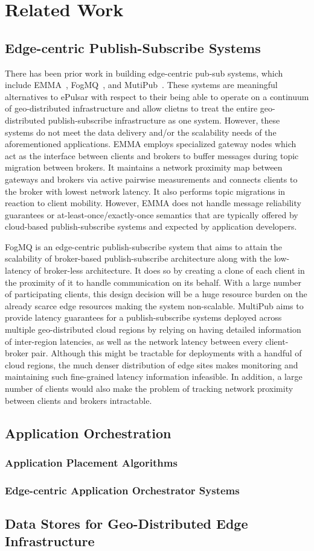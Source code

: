 \chapter{Related Work}

\section{Edge-centric Publish-Subscribe Systems}

There has been prior work in building edge-centric pub-sub systems, which include EMMA~\cite{emma}, FogMQ~\cite{DBLP:journals/corr/AbdelwahabH16a}, and MutiPub~\cite{multipub}. These systems are meaningful alternatives to ePulsar with respect to their being able to operate on a continuum of geo-distributed infrastructure and allow clietns to treat the entire geo-distributed publish-subscribe infrastructure as one system. However, these systems do not meet the data delivery and/or the scalability needs of the aforementioned applications. EMMA employs specialized gateway nodes which act as the interface between clients and brokers to buffer messages during topic migration between brokers. It maintains a network proximity map between gateways and brokers via active pairwise measurements and connects clients to the broker with lowest network latency. It also performs topic migrations in reaction to client mobility. However, EMMA does not handle message reliability guarantees or at-least-once/exactly-once semantics that are typically offered by cloud-based publish-subscribe systems and expected by application developers. 
\par FogMQ is an edge-centric publish-subscribe system that aims to attain the scalability of broker-based publish-subscribe architecture along with the low-latency of broker-less architecture. It does so by creating a clone of each client in the proximity of it to handle communication on its behalf. With a large number of participating clients, this design decision will be a huge resource burden on the already scarce edge resources making the system non-scalable. MultiPub aims to provide latency guarantees for a publish-subscribe systems deployed across multiple geo-distributed cloud regions by relying on having detailed information of inter-region latencies, as well as the network latency between every client-broker pair. Although this might be tractable for deployments with a handful of cloud regions, the much denser distribution of edge sites makes monitoring and maintaining such fine-grained latency information infeasible. In addition, a large number of clients would also make the problem of tracking network proximity between clients and brokers intractable.

\section{Application Orchestration}
\subsection{Application Placement Algorithms}
\subsection{Edge-centric Application Orchestrator Systems}


\section{Data Stores for Geo-Distributed Edge Infrastructure}
